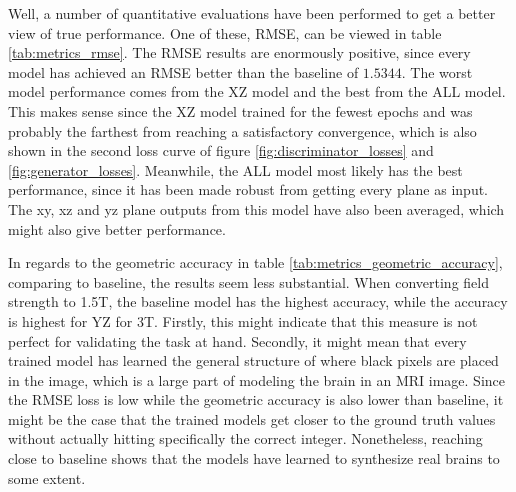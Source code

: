 \documentclass[11pt, fleqn, titlepage]{article}
\newcommand{\1}[1]{\mathds{1}\left[#1\right]}
\begin{document}
Well, a number of quantitative evaluations have been performed to get a better view of true performance. One of these, RMSE, can be viewed in table \ref{tab:metrics_rmse}. The RMSE results are enormously positive, since every model has achieved an RMSE better than the baseline of $1.5344$. The worst model performance comes from the XZ model and the best from the ALL model. This makes sense since the XZ model trained for the fewest epochs and was probably the farthest from reaching a satisfactory convergence, which is also shown in the second loss curve of figure \ref{fig:discriminator_losses} and \ref{fig:generator_losses}. Meanwhile, the ALL model most likely has the best performance, since it has been made robust from getting every plane as input. The xy, xz and yz plane outputs from this model have also been averaged, which might also give better performance.

In regards to the geometric accuracy in table \ref{tab:metrics_geometric_accuracy}, comparing to baseline, the results seem less substantial. When converting field strength to 1.5T, the baseline model has the highest accuracy, while the accuracy is highest for YZ for 3T. Firstly, this might indicate that this measure is not perfect for validating the task at hand. Secondly, it might mean that every trained model has learned the general structure of where black pixels are placed in the image, which is a large part of modeling the brain in an MRI image. Since the RMSE loss is low while the geometric accuracy is also lower than baseline, it might be the case that the trained models get closer to the ground truth values without actually hitting specifically the correct integer. Nonetheless, reaching close to baseline shows that the models have learned to synthesize real brains to some extent.
\end{document}
